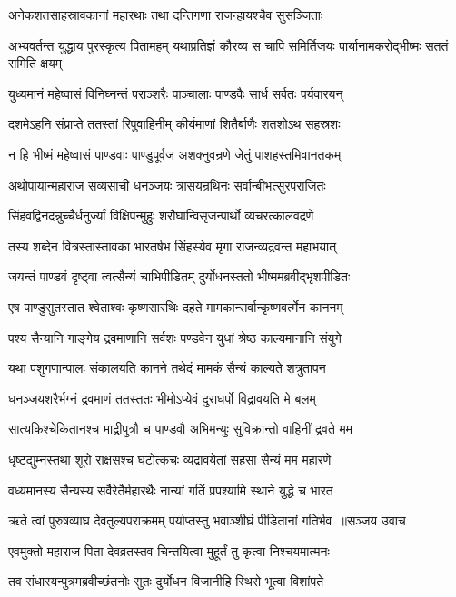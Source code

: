 \twolineshloka
{अनेकशतसाहस्रावकानां महारथाः}
{तथा दन्तिगणा राजन्हायश्चैव सुसञ्जिताः}


अभ्यवर्तन्त युद्धाय पुरस्कृत्य पितामहम्
\twolineshloka
{यथाप्रतिज्ञं कौरव्य स चापि समिर्तिजयः}
{पार्यानामकरोद्भीष्मः सततं समिति क्षयम्}


\twolineshloka
{युध्यमानं महेष्वासं विनिघ्नन्तं पराञ्शरैः}
{पाञ्चालाः पाण्डवैः सार्ध सर्वतः पर्यवारयन्}


\twolineshloka
{दशमेऽहनि संप्राप्ते ततस्तां रिपुवाहिनीम्}
{कीर्यमाणां शितैर्बाणैः शतशोऽथ सहस्रशः}


\twolineshloka
{न हि भीष्मं महेष्वासं पाण्डवाः पाण्डुपूर्वज}
{अशक्नुवन्रणे जेतुं पाशहस्तमिवानतकम्}


\twolineshloka
{अथोपायान्महाराज सव्यसाची धनञ्जयः}
{त्रासयन्रथिनः सर्वान्बीभत्सुरपराजितः}


\twolineshloka
{सिंहवद्विनदन्नुच्चैर्धनुर्ज्यां विक्षिपन्मुहुः}
{शरौघान्विसृजन्पार्थो व्यचरत्कालवद्रणे}


\twolineshloka
{तस्य शब्देन वित्रस्तास्तावका भारतर्षभ}
{सिंहस्येव मृगा राजन्व्यद्रवन्त महाभयात्}


\twolineshloka
{जयन्तं पाण्डवं दृष्ट्वा त्वत्सैन्यं चाभिपीडितम्}
{दुर्योधनस्ततो भीष्ममब्रवीद्भृशपीडितः}


\twolineshloka
{एष पाण्डुसुतस्तात श्वेताश्वः कृष्णसारथिः}
{दहते मामकान्सर्वान्कृष्णवर्त्मेन काननम्}


\twolineshloka
{पश्य सैन्यानि गाङ्गेय द्रवमाणानि सर्वशः}
{पण्डवेन युधां श्रेष्ठ काल्यमानानि संयुगे}


\twolineshloka
{यथा पशुगणान्पालः संकालयति कानने}
{तथेदं मामकं सैन्यं काल्यते शत्रुतापन}


\twolineshloka
{धनञ्जयशरैर्भग्नं द्रवमाणं ततस्ततः}
{भीमोऽप्येवं दुराधर्पो विद्रावयति मे बलम्}


\twolineshloka
{सात्यकिश्चेकितानश्च माद्रीपुत्रौ च पाण्डवौ}
{अभिमन्युः सुविक्रान्तो वाहिनीं द्रवते मम}


\twolineshloka
{धृष्टद्युम्नस्तथा शूरो राक्षसश्च घटोत्कचः}
{व्यद्रावयेतां सहसा सैन्यं मम महारणे}


\twolineshloka
{वध्यमानस्य सैन्यस्य सर्वैरेतैर्महारथैः}
{नान्यां गतिं प्रपश्यामि स्थाने युद्धे च भारत}


\threelineshloka
{ऋते त्वां पुरुषव्याघ्र देवतुल्यपराक्रमम्}
{पर्याप्तस्तु भवाञ्शीघ्रं पीडितानां गतिर्भव ॥सञ्जय उवाच}
{}


\twolineshloka
{एवमुक्तो महाराज पिता देवव्रतस्तव}
{चिन्तयित्वा मुहूर्तं तु कृत्वा निश्चयमात्मनः}


\twolineshloka
{तव संधारयन्पुत्रमब्रवीच्छंतनोः सुतः}
{दुर्योधन विजानीहि स्थिरो भूत्वा विशांपते}


